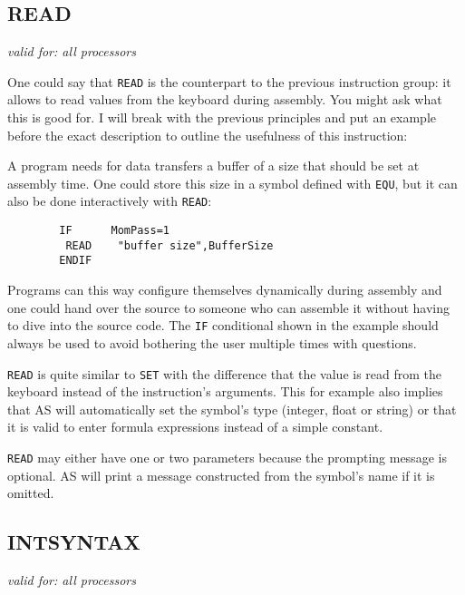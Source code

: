 \documentclass[12pt,twoside]{report}
\makeatletter
\newcommand{\tty}[1]{{\tt #1}}
\newcommand{\ttindex}[1]{\index{#1@{\tt #1}}}
\newcommand{\asname}{{AS}}
\makeatother
\begin{document}

\subsection{READ}
\ttindex{READ}

{\em valid for: all processors}

One could say that \tty{READ} is the counterpart to the previous
instruction group: it allows to read values from the keyboard during
assembly.  You might ask what this is good for.  I will break with
the previous principles and put an example before the exact
description to outline the usefulness of this instruction:

A program needs for data transfers a buffer of a size that should be
set at assembly time.  One could store this size in a symbol defined
with \tty{EQU}, but it can also be done interactively with \tty{READ}:
\begin{verbatim}
        IF      MomPass=1
         READ    "buffer size",BufferSize
        ENDIF
\end{verbatim}
Programs can this way configure themselves dynamically during assembly
and one could hand over the source to someone who can assemble it
without having to dive into the source code.  The \tty{IF} conditional
shown in the example should always be used to avoid bothering the
user multiple times with questions.

\tty{READ} is quite similar to \tty{SET} with the difference that the
value is read from the keyboard instead of the instruction's arguments.
This for example also implies that \asname{} will automatically set the symbol's
type (integer, float or string) or that it is valid to enter formula
expressions instead of a simple constant.

\tty{READ} may either have one or two parameters because the prompting
message is optional.  \asname{} will print a message constructed from the
symbol's name if it is omitted.


\subsection{INTSYNTAX}
\label{SectINTSYNTAX}
\ttindex{INTSYNTAX}

{\em valid for: all processors}
\end{document}
